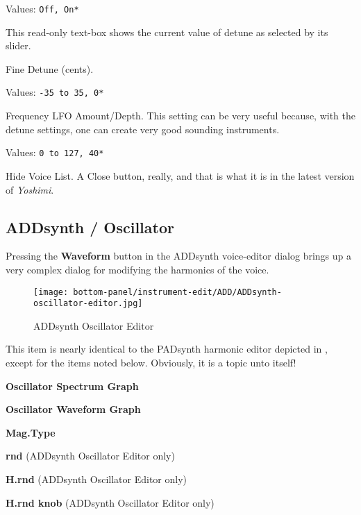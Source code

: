    Values: \texttt{Off, On*}

   This read-only text-box shows the current value of detune as selected by
   its slider.

   Fine Detune (cents).

   Values: \texttt{-35 to 35, 0*}

   Frequency LFO Amount/Depth.
   This setting can be very useful because, with the detune settings, one can
   create very good sounding instruments.

   Values: \texttt{0 to 127, 40*}

   Hide Voice List.  A Close button, really, and that is what it is in the
   latest version of \textsl{Yoshimi}.

\subsection{ADDsynth / Oscillator}
\label{subsec:addsynth_oscillator}

   Pressing the \textbf{Waveform} button in the ADDsynth
   voice-editor dialog brings up a very complex dialog for modifying the
   harmonics of the voice.

\begin{figure}[H]
   \centering
   \texttt{[image: bottom-panel/instrument-edit/ADD/ADDsynth-oscillator-editor.jpg]}
   \caption{ADDsynth Oscillator Editor}
   \label{fig:addsynth_oscillator_editor}
\end{figure}

   This item is nearly identical to the PADsynth harmonic editor depicted in
   ,
   except for the items noted below.
   Obviously, it is a topic unto itself!

   \begin{enumber}
      \item \textbf{Oscillator Spectrum Graph}
      \item \textbf{Oscillator Waveform Graph}
      \item \textbf{Mag.Type}
      \item \textbf{rnd} (ADDsynth Oscillator Editor only)
      \item \textbf{H.rnd} (ADDsynth Oscillator Editor only)
      \item \textbf{H.rnd knob} (ADDsynth Oscillator Editor only)
   \end{enumber}

